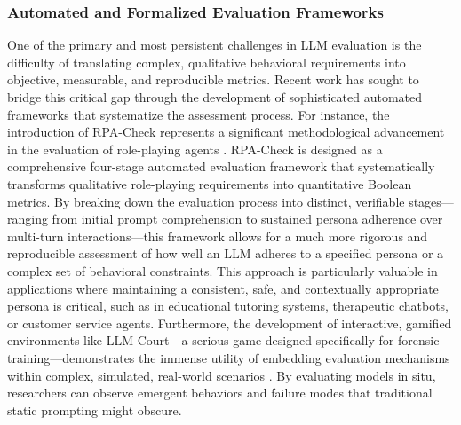 \documentclass[11pt,a4paper]{article}
\begin{document}
\subsubsection{Automated and Formalized Evaluation Frameworks}

One of the primary and most persistent challenges in LLM evaluation is the difficulty of translating complex, qualitative behavioral requirements into objective, measurable, and reproducible metrics. Recent work has sought to bridge this critical gap through the development of sophisticated automated frameworks that systematize the assessment process. For instance, the introduction of RPA-Check represents a significant methodological advancement in the evaluation of role-playing agents \cite{Rosati_2026_LLM}. RPA-Check is designed as a comprehensive four-stage automated evaluation framework that systematically transforms qualitative role-playing requirements into quantitative Boolean metrics. By breaking down the evaluation process into distinct, verifiable stages---ranging from initial prompt comprehension to sustained persona adherence over multi-turn interactions---this framework allows for a much more rigorous and reproducible assessment of how well an LLM adheres to a specified persona or a complex set of behavioral constraints. This approach is particularly valuable in applications where maintaining a consistent, safe, and contextually appropriate persona is critical, such as in educational tutoring systems, therapeutic chatbots, or customer service agents. Furthermore, the development of interactive, gamified environments like LLM Court---a serious game designed specifically for forensic training---demonstrates the immense utility of embedding evaluation mechanisms within complex, simulated, real-world scenarios \cite{Rosati_2026_LLM}. By evaluating models in situ, researchers can observe emergent behaviors and failure modes that traditional static prompting might obscure.
\end{document}
